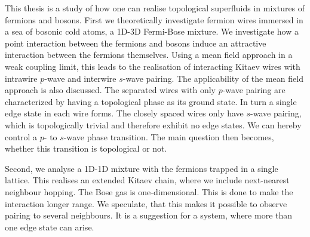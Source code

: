 \newpage
This thesis is a study of how one can realise topological superfluids in mixtures of fermions and bosons. First we theoretically investigate fermion wires immersed in a sea of bosonic cold atoms, a 1D-3D Fermi-Bose mixture. We investigate how a point interaction between the fermions and bosons induce an attractive interaction between the fermions themselves. Using a mean field approach in a weak coupling limit, this leads to the realisation of interacting Kitaev wires with intrawire $p$-wave and interwire $s$-wave pairing. The applicability of the mean field approach is also discussed. The separated wires with only $p$-wave pairing are characterized by having a topological phase as its ground state. In turn a single edge state in each wire forms. The closely spaced wires only have $s$-wave pairing, which is topologically trivial and therefore exhibit no edge states. We can hereby control a $p$- to $s$-wave phase transition. The main question then becomes, whether this transition is topological or not. 

Second, we analyse a 1D-1D mixture with the fermions trapped in a single lattice. This realises an extended Kitaev chain, where we include next-nearest neighbour hopping. The Bose gas is one-dimensional. This is done to make the interaction longer range. We speculate, that this makes it possible to observe pairing to several neighbours. It is a suggestion for a system, where more than one edge state can arise. 

